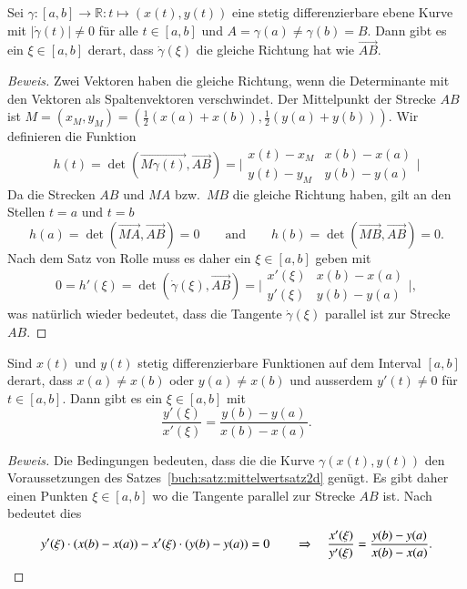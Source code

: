 \begin{satz}
\label{buch:satz:mittelwertsatz2d}
Sei $\gamma\colon[a,b]\to\mathbb R:t\mapsto (x(t),y(t))$ eine
stetig differenzierbare ebene Kurve mit $|\dot{\gamma}(t)|\ne 0$ für
alle $t\in[a,b]$ und $A=\gamma(a)\ne\gamma(b)=B$.
Dann gibt es ein $\xi\in[a,b]$ derart, dass $\dot{\gamma}(\xi)$ die gleiche
Richtung hat wie $\overrightarrow{AB}$.
\end{satz}

\begin{proof}[Beweis]
Zwei Vektoren haben die gleiche Richtung, wenn die Determinante
mit den Vektoren als Spaltenvektoren verschwindet.
Der Mittelpunkt der Strecke $AB$ ist
$M=(x_M,y_M) = (\frac12(x(a)+x(b)),\frac12(y(a)+y(b)))$.
Wir definieren die Funktion
\[
h(t)
=
\det(\overrightarrow{M\gamma(t)}, \overrightarrow{AB})
=
\biggl|
\begin{matrix}
x(t) - x_M & x(b)-x(a) \\
y(t) - y_M & y(b)-y(a)
\end{matrix}
\biggr|
\]
Da die Strecken $AB$ und $MA$ bzw.~$MB$ die gleiche Richtung haben,
gilt an den Stellen $t=a$ und $t=b$ 
\[
h(a)
=
\det (\overrightarrow{MA},\overrightarrow{AB})
= 0
\qquad\text{and}\qquad
h(b)
=
\det (\overrightarrow{MB},\overrightarrow{AB})
=
0.
\]
Nach dem Satz von Rolle muss es daher ein $\xi\in[a,b]$ geben mit
\begin{equation}
0
=
h'(\xi)
=
\det(
\dot{\gamma}(\xi),
\overrightarrow{AB}
)
=
\biggl|
\begin{matrix}
x'(\xi) & x(b)-x(a) \\
y'(\xi) & y(b)-y(a)
\end{matrix}
\biggr|,
\label{buch:polynome:eqn:mittelwertsatz2d}
\end{equation}
was natürlich wieder bedeutet, dass die Tangente $\dot{\gamma}(\xi)$ 
parallel ist zur Strecke $AB$.
\end{proof}


\begin{satz}
\label{buch:satz:vmittelwertsatz}
Sind $x(t)$ und $y(t)$ stetig differenzierbare Funktionen auf dem Interval
$[a,b]$ derart, dass $x(a)\ne x(b)$ oder $y(a)\ne x(b)$ und ausserdem
$y'(t)\ne 0$ für $t\in[a,b]$.
Dann gibt es ein $\xi\in[a,b]$ mit
\[
\frac{y'(\xi)}{x'(\xi)}
=
\frac{y(b)-y(a)}{x(b)-x(a)}.
\]
\end{satz}

\begin{proof}[Beweis]
Die Bedingungen bedeuten, dass die die Kurve $\gamma(x(t),y(t))$
den Voraussetzungen des Satzes~\ref{buch:satz:mittelwertsatz2d}
genügt.
Es gibt daher einen Punkten $\xi\in[a,b]$ wo die Tangente
parallel zur Strecke $AB$ ist.
Nach~\label{buch:polynome:eqn:mittelwertsatz2d} bedeutet dies
\[
y'(\xi) \cdot (x(b)-x(a))
-
x'(\xi) \cdot (y(b)-y(a))
=0
\qquad\Rightarrow\quad
\frac{x'(\xi)}{y'(\xi)}
=
\frac{y(b)-y(a)}{x(b)-x(a)}.
\qedhere
\]
\end{proof}

